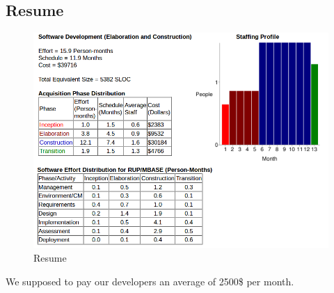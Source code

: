 \subsection{Resume}
\begin{figure}[H]
\centering
\includegraphics[trim = 60 0 0 0,scale = 0.6]{Size_Cost_Effort/online}
\caption{Resume}
\end{figure}

We supposed to pay our developers an average of 2500\$ per month.